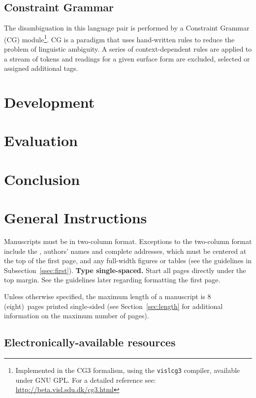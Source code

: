 \documentclass[11pt]{article}
\newcommand{\paperlength}{$8$ (eight)}
\newcommand{\shortpaperlength}{$4$ (four)}
\begin{document}
\subsection* {Constraint Grammar}
The 
disambiguation in this language pair is performed by a
Constraint Grammar (CG) module\footnote{Implemented in the CG3 formalism, using the \texttt{vislcg3} compiler, available under GNU GPL. For a detailed reference see: \url{http://beta.visl.sdu.dk/cg3.html}}. CG is a 
paradigm that uses hand-written rules to reduce the problem 
of linguistic ambiguity. A series of context-dependent rules are applied 
to a stream of tokens and readings for a given surface form are excluded, 
selected or assigned additional tags.

\section{Development}
\section{Evaluation}
\section{Conclusion}

\section{General Instructions}

Manuscripts must be in two-column format.  Exceptions to the
two-column format include the {}, authors' names and complete
addresses, which must be centered at the top of the first page, and
any full-width figures or tables (see the guidelines in
Subsection~\ref{ssec:first}). {\bf Type single-spaced.}  Start all
pages directly under the top margin. See the guidelines later
regarding formatting the first page.

Unless otherwise specified, the maximum length of a manuscript is \paperlength~pages
printed single-sided (see Section~\ref{sec:length} for additional information on the
maximum number of pages).

\subsection{Electronically-available resources}
\end{document}
